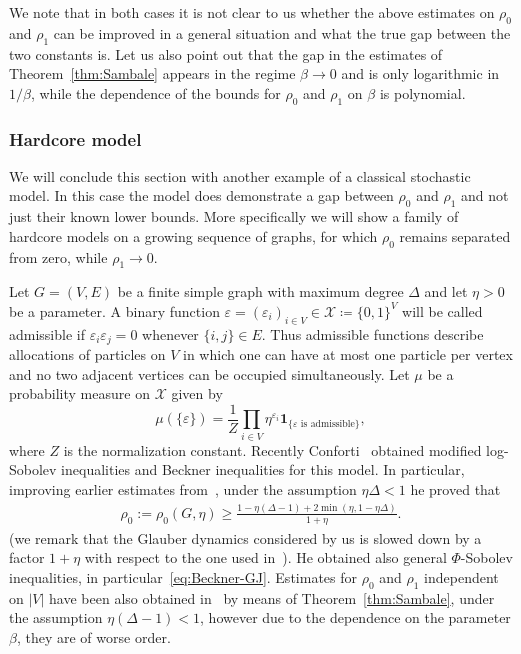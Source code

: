 \documentclass[a4paper]{amsart}
\theoremstyle{definition}
\theoremstyle{remark}
\numberwithin{equation}{section}
\newcommand*{\ind}[1]{\mathbf{1}_{#1}}
\begin{document}
We note that in both cases it is not clear to us whether the above estimates on $\rho_0$ and $\rho_1$ can be improved in a general situation and what the true gap between the two constants is.  Let us also point out that the gap in the estimates of Theorem~\ref{thm:Sambale} appears in the regime $\beta \to 0$ and is only logarithmic in $1/\beta$, while the dependence of the bounds for $\rho_0$ and $\rho_1$ on $\beta$ is polynomial.

\medskip

\subsubsection{Hardcore model}
We will conclude this section with another example of a classical stochastic  model. In this case the model does demonstrate a gap between $\rho_0$ and $\rho_1$ and not just their known lower bounds. More specifically we will show a family of hardcore models on a growing sequence of graphs, for which $\rho_0$ remains separated from zero, while $\rho_1 \to 0$.


Let $G = (V,E)$ be a finite simple graph with maximum degree $\Delta$ and let $\eta > 0$ be a parameter. A binary function $\varepsilon  = (\varepsilon_i)_{i\in V}\in  \mathcal{X} \coloneqq \{0,1\}^V$ will be called admissible if
$\varepsilon_i\varepsilon_j = 0$ whenever $\{i,j\} \in E$. Thus admissible functions describe allocations of particles on $V$ in which one can have at most one particle per vertex and no two adjacent vertices can be occupied simultaneously.  Let $\mu$ be a probability measure on $\mathcal{X}$ given by
\begin{displaymath}
  \mu(\{\varepsilon\}) = \frac{1}{Z}\prod_{i\in V} \eta^{\varepsilon_i}\ind{\{\textrm{$\varepsilon$ is admissible}\}},
\end{displaymath}
where $Z$ is the normalization constant.
Recently Conforti~\cite{conforti2020probabilistic} obtained modified log-Sobolev inequalities and Beckner inequalities for this model. In particular, improving earlier estimates from~\cite{MR3646066}, under the assumption $\eta \Delta < 1$ he proved that
\begin{align}\label{eq:conforti}
  \rho_0 := \rho_0(G,\eta) \ge \frac{1 - \eta(\Delta-1) + 2\min(\eta,1-\eta\Delta)}{1+\eta}.
\end{align}
(we remark that the Glauber dynamics considered by us is slowed down by a factor $1+\eta$ with respect to the one used in~\cite{conforti2020probabilistic}).
  He obtained also general $\Phi$-Sobolev inequalities, in particular~\eqref{eq:Beckner-GJ}. Estimates for $\rho_0$ and $\rho_1$ independent on $|V|$ have been also obtained in~\cite{Sambale_2020} by means of Theorem~\ref{thm:Sambale}, under the assumption $\eta(\Delta - 1) < 1$, however due to the dependence on the parameter $\beta$, they are of worse order.
\end{document}
